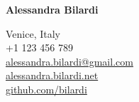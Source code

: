 \documentclass[9pt]{stackoverflow} %
\begin{document}

\begin{minipage}[t]{0.7\textwidth} %
	\vspace{-\baselineskip} %
	
	{\HUGE\textcolor{stackoverflow-name}{\textbf{Alessandra Bilardi}}} %
	{\HUGE\textcolor{stackoverflow-name}{\textbf{}}} %

\end{minipage}
\begin{minipage}[t]{0.3\textwidth} %
	\vspace{-\baselineskip} %
	\begin{flushright}
		{\small
			{Venice, Italy}\\
			{+1 123 456 789}\\
			{\href{mailto:alessandra.bilardi@gmail.com}{alessandra.bilardi@gmail.com}}\\	
			{\href{https://alessandra.bilardi.net}{alessandra.bilardi.net}}\\
			{\href{https://github.com/bilardi}{github.com/bilardi}}\\
		}
	\end{flushright}
\end{minipage}

\end{document}
